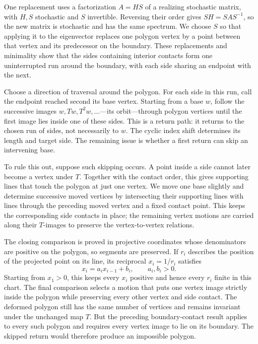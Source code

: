 \documentclass[11pt,a4paper]{article}
\theoremstyle{definition}
\theoremstyle{remark}
\numberwithin{equation}{section}
\begin{document}
One replacement uses a factorization $A=HS$ of a realizing stochastic matrix, with $H,S$ stochastic and $S$ invertible. Reversing their order gives $SH=SAS^{-1}$, so the new matrix is stochastic and has the same spectrum. We choose $S$ so that applying it to the eigenvector replaces one polygon vertex by a point between that vertex and its predecessor on the boundary. These replacements and minimality show that the sides containing interior contacts form one uninterrupted run around the boundary, with each side sharing an endpoint with the next.

Choose a direction of traversal around the polygon. For each side in this run, call the endpoint reached second its base vertex. Starting from a base $w$, follow the successive images $w,Tw,T^2w,\ldots$---its orbit---through polygon vertices until the first image lies inside one of these sides. This is a return path: it returns to the chosen run of sides, not necessarily to $w$. The cyclic index shift determines its length and target side. The remaining issue is whether a first return can skip an intervening base.

To rule this out, suppose such skipping occurs. A point inside a side cannot later become a vertex under $T$. Together with the contact order, this gives supporting lines that touch the polygon at just one vertex. We move one base slightly and determine successive moved vertices by intersecting their supporting lines with lines through the preceding moved vertex and a fixed contact point. This keeps the corresponding side contacts in place; the remaining vertex motions are carried along their $T$-images to preserve the vertex-to-vertex relations.

The closing comparison is proved in projective coordinates whose denominators are positive on the polygon, so segments are preserved. If $r_i$ describes the position of the projected point on its line, its reciprocal $x_i=1/r_i$ satisfies
\[
 x_i=a_i x_{i-1}+b_i,\qquad a_i,b_i>0.
\]
Starting from $x_1>0$, this keeps every $x_i$ positive and hence every $r_i$ finite in this chart. The final comparison selects a motion that puts one vertex image strictly inside the polygon while preserving every other vertex and side contact. The deformed polygon still has the same number of vertices and remains invariant under the unchanged map $T$. But the preceding boundary-contact result applies to every such polygon and requires every vertex image to lie on its boundary. The skipped return would therefore produce an impossible polygon.
\end{document}
